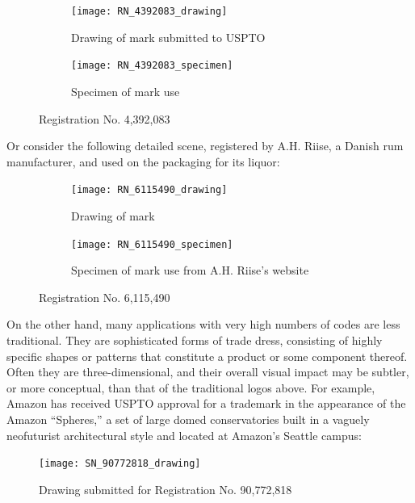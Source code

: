\documentclass[letterpaper, 11pt, oneside]{article}
\begin{document}
\begin{figure}[H]
\centering
\begin{subfigure}[h]{0.3\linewidth}
\texttt{[image: RN\_4392083\_drawing]} \
\caption{Drawing of mark submitted to USPTO}
\end{subfigure}
\hspace{30pt}
\begin{subfigure}[h]{0.425\linewidth}
\texttt{[image: RN\_4392083\_specimen]} \
\caption{Specimen of mark use}
\end{subfigure}
\caption*{Registration No. 4,392,083}
\end{figure}
\par

\noindent Or consider the following detailed scene, registered by A.H. Riise, a Danish rum manufacturer, and used on the packaging for its liquor:

\begin{figure}[H]
\centering
\begin{subfigure}[h]{0.4\linewidth}
\texttt{[image: RN\_6115490\_drawing]} \
\caption{Drawing of mark}
\end{subfigure}
\hspace{30pt}
\begin{subfigure}[h]{0.25\linewidth}
\texttt{[image: RN\_6115490\_specimen]} \
\caption{Specimen of mark use from A.H. Riise's website}
\end{subfigure}
\caption*{Registration No. 6,115,490}
\end{figure}
\par

\noindent On the other hand, many applications with very high numbers of codes are less traditional. They are sophisticated forms of trade dress, consisting of highly specific shapes or patterns that constitute a product or some component thereof. Often they are three-dimensional, and their overall visual impact may be subtler, or more conceptual, than that of the traditional logos above. For example, Amazon has received USPTO approval for a trademark in the appearance of the Amazon ``Spheres,'' a set of large domed conservatories built in a vaguely neofuturist architectural style and located at Amazon's Seattle campus:

\begin{figure}[H]
\centering
\texttt{[image: SN\_90772818\_drawing]} \
\caption*{Drawing submitted for Registration No. 90,772,818}
\end{figure}
\par
\end{document}
